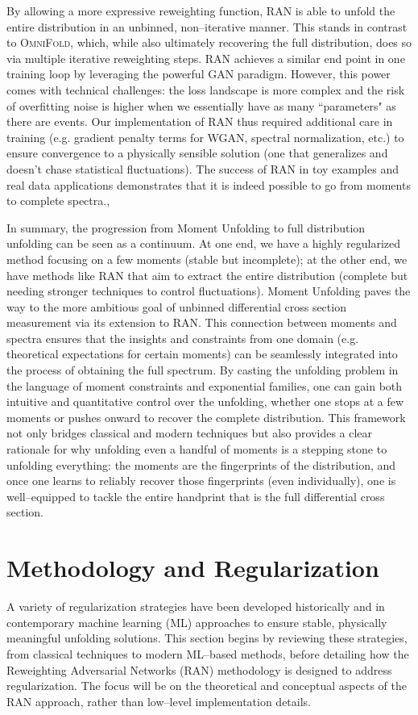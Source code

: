         By allowing a more expressive reweighting function, RAN is able to unfold the entire distribution in an unbinned, non--iterative manner.
        This stands in contrast to \textsc{OmniFold}, which, while also ultimately recovering the full distribution, does so via multiple iterative reweighting steps.
        RAN achieves a similar end point in one training loop by leveraging the powerful GAN paradigm.
        However, this power comes with technical challenges: the loss landscape is more complex and the risk of overfitting noise is higher when we essentially have as many ``parameters" as there are events.
        Our implementation of RAN thus required additional care in training (e.g. gradient penalty terms for WGAN, spectral normalization, etc.) to ensure convergence to a physically sensible solution (one that generalizes and doesn’t chase statistical fluctuations).
        The success of RAN in toy examples and real data applications demonstrates that it is indeed possible to go from moments to complete spectra.,

In summary, the progression from Moment Unfolding to full distribution unfolding can be seen as a continuum.
%
At one end, we have a highly regularized method focusing on a few moments (stable but incomplete); at the other end, we have methods like RAN that aim to extract the entire distribution (complete but needing stronger techniques to control fluctuations).
%
Moment Unfolding paves the way to the more ambitious goal of unbinned differential cross section measurement via its extension to RAN.
%
This connection between moments and spectra ensures that the insights and constraints from one domain (e.g. theoretical expectations for certain moments) can be seamlessly integrated into the process of obtaining the full spectrum.
%
By casting the unfolding problem in the language of moment constraints and exponential families, one can gain both intuitive and quantitative control over the unfolding, whether one stops at a few moments or pushes onward to recover the complete distribution.
%
This framework not only bridges classical and modern techniques but also provides a clear rationale for why unfolding even a handful of moments is a stepping stone to unfolding everything: the moments are the fingerprints of the distribution, and once one learns to reliably recover those fingerprints (even individually), one is well--equipped to tackle the entire handprint that is the full differential cross section.

\section{Methodology and Regularization}
    A variety of regularization strategies have been developed historically and in contemporary machine learning (ML) approaches to ensure stable, physically meaningful unfolding solutions.
    This section begins by reviewing these strategies, from classical techniques to modern ML--based methods, before detailing how the Reweighting Adversarial Networks (RAN) methodology is designed to address regularization.
    The focus will be on the theoretical and conceptual aspects of the RAN approach, rather than low--level implementation details.

